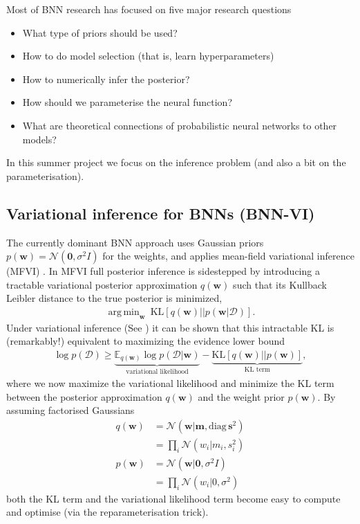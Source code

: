 \documentclass{article}
\def\s{\mathbf{s}}
\def\D{\mathcal{D}}
\def\w{\mathbf{w}}
\def\m{\mathbf{m}}
\def\0{\mathbf{0}}
\def\N{\mathcal{N}}
\def\E{\mathbb{E}}
\def\diag{\mathrm{diag}}
\def\kl{\mathrm{KL}}
\DeclareMathOperator*{\argmin}{arg\,min}
\begin{document}
Most of BNN research has focused on five major research questions
\begin{itemize}
    \item What type of priors should be used?
    \item How to do model selection (that is, learn hyperparameters)
    \item How to numerically infer the posterior? 
    \item How should we parameterise the neural function?
    \item What are theoretical connections of probabilistic neural networks to other models? 
\end{itemize}

In this summer project we focus on the inference problem (and also a bit on the parameterisation).

\subsection{Variational inference for BNNs (BNN-VI)}

The currently dominant BNN approach uses Gaussian priors $p(\w) = \N(\0, \sigma^2 I)$ for the weights, and applies mean-field variational inference (MFVI) \citep{blundell2015weight}. In MFVI full posterior inference is sidestepped by introducing a tractable variational posterior approximation $q(\w)$ such that its Kullback Leibler distance to the true posterior is minimized,
\begin{align}
    \argmin_{\w} \: \kl[ q(\w) || p(\w | \D)].
\end{align}
Under variational inference (See \citet{blei2017}) it can be shown that this intractable KL is (remarkably!) equivalent to maximizing the evidence lower bound
\begin{align}
    \log p(\D) \ge \underbrace{\E_{q(\w)} \log p(\D | \w)}_{\text{variational likelihood}} - \underbrace{\kl[ q(\w) || p(\w)]}_{\text{KL term}},
\end{align}
where we now maximize the variational likelihood and minimize the KL term between the posterior approximation $q(\w)$ and the weight prior $p(\w)$. By assuming factorised Gaussians
\begin{align}
    q(\w) &= \N(\w | \m, \diag \, \s^2) \\
    &= \prod_i \N(w_i | m_i, s_i^2) \\
    p(\w) &= \N(\w | \0, \sigma^2 I) \\
    &= \prod_i \N(w_i | 0, \sigma^2)
\end{align}
both the KL term and the variational likelihood term become easy to compute and optimise (via the reparameterisation trick). 
\end{document}
